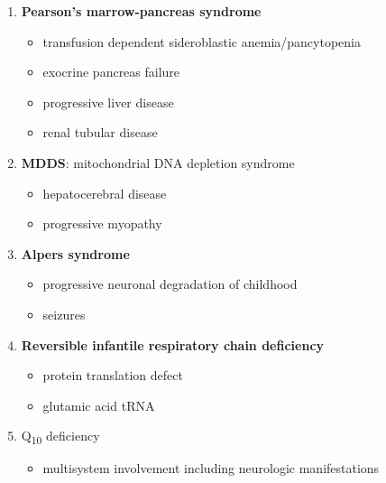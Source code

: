 \documentclass{scrartcl}
\begin{document}
\begin{enumerate}
\begin{enumerate}
\item \textbf{Pearson's marrow-pancreas syndrome}
\label{sec:org356d266}
\begin{itemize}
\item transfusion dependent sideroblastic anemia/pancytopenia
\item exocrine pancreas failure
\item progressive liver disease
\item renal tubular disease
\end{itemize}
\item \textbf{MDDS}: mitochondrial DNA depletion syndrome
\label{sec:org5802052}
\begin{itemize}
\item hepatocerebral disease
\item progressive myopathy
\end{itemize}
\item \textbf{Alpers syndrome}
\label{sec:org7aabc73}
\begin{itemize}
\item progressive neuronal degradation of childhood
\item seizures
\end{itemize}
\item \textbf{Reversible infantile respiratory chain deficiency}
\label{sec:org0138b5c}
\begin{itemize}
\item protein translation defect
\item glutamic acid tRNA
\end{itemize}
\item Q\textsubscript{10} deficiency
\label{sec:orgbc3743c}
\begin{itemize}
\item multisystem involvement including neurologic manifestations

\end{itemize}
\end{enumerate}
\end{enumerate}
\end{document}
